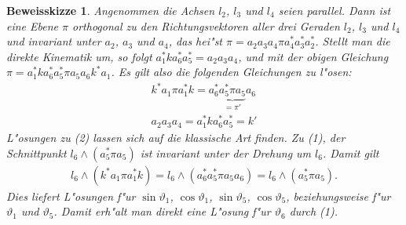 \documentclass[paper=A4, twoside, chapterprefix=true, bibliography=totoc, headsepline]{scrbook}
\renewcommand{\thesection}{\arabic{section}}
\renewcommand*{\sectionmarkformat}{\thesection\autodot\enskip}
\let\temp\phi
\let\phi\varphi
\let\varphi\temp
\let\temp\theta
\let\theta\vartheta
\let\vartheta\temp
\let\temp\epsilon
\let\epsilon\varepsilon
\let\varepsilon\temp
\let\temp\rho
\let\rho\varrho
\let\varrho\temp
\theoremstyle{nonumberbreak}
\newtheorem{bewSkiz}{Beweisskizze}
\theoremstyle{emptybreak}
\theoremstyle{break}
\begin{document}
\begin{bewSkiz}
Angenommen die Achsen $l_2$, $l_3$ und $l_4$ seien parallel.
Dann ist eine Ebene $\pi$ orthogonal zu den Richtungsvektoren aller drei Geraden $l_2$, $l_3$ und $l_4$ und invariant unter $a_2$, $a_3$ und $a_4$, das hei"st $\pi = a_2 a_3 a_4 \pi a_4^* a_3^* a_2^*$.
Stellt man die direkte Kinematik um, so folgt $a_1^* k a_6^* a_5^* = a_2 a_3 a_4$, und mit der obigen Gleichung $\pi = a_1^* k a_6^* a_5^* \pi a_5 a_6 k^* a_1$.
Es gilt also die folgenden Gleichungen zu l"osen:
\begin{align*}
	k^* a_1 \pi a_1^* k = a_6^* \underbrace{a_5^* \pi a_5}_{= \pi'} a_6 \tag{1} \\
	a_2 a_3 a_4 = a_1^* k a_6^* a_5^* = k' \tag{2}
\end{align*}
L"osungen zu (2) lassen sich auf die klassische Art finden.
Zu (1), der Schnittpunkt $l_6 \wedge (a_5^* \pi a_5)$ ist invariant unter der Drehung um $l_6$.
Damit gilt
\begin{align*}
	l_6 \wedge (k^* a_1 \pi a_1^* k) = l_6 \wedge (a_6^* a_5^* \pi a_5 a_6) = l_6 \wedge (a_5^* \pi a_5).
\end{align*}
Dies liefert L"osungen f"ur $\sin \theta_1$, $\cos \theta_1$, $\sin \theta_5$, $\cos \theta_5$, beziehungsweise f"ur $\theta_1$ und $\theta_5$.
Damit erh"alt man direkt eine L"osung f"ur $\theta_6$ durch (1).
\end{bewSkiz}





\appendix


\renewcommand*{\othersectionlevelsformat}[3]{\ifstr{#1}{section}{\"Ubung\ #3\ vom\ }{#3\autodot\enskip}}

\renewcommand*{\sectionmarkformat}{\"Ubung \thesection\autodot\ vom\enskip}
\end{document}

